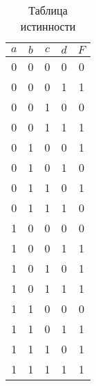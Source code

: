 \documentclass[a4paper]{article}
\begin{document}
    \begin{table}[h]
        \begin{center}
            \begin{tabular}{ | c | c | c | c | c | }
                \hline
                $ a $ & $ b $ & $ c $ & $ d $ & $ F $ \\
                \hline
                0     & 0     & 0     & 0     & 0     \\
                \hline
                0     & 0     & 0     & 1     & 1     \\
                \hline
                0     & 0     & 1     & 0     & 0     \\
                \hline
                0     & 0     & 1     & 1     & 1     \\
                \hline
                0     & 1     & 0     & 0     & 1     \\
                \hline
                0     & 1     & 0     & 1     & 0     \\
                \hline
                0     & 1     & 1     & 0     & 1     \\
                \hline
                0     & 1     & 1     & 1     & 0     \\
                \hline
                1     & 0     & 0     & 0     & 0     \\
                \hline
                1     & 0     & 0     & 1     & 1     \\
                \hline
                1     & 0     & 1     & 0     & 1     \\
                \hline
                1     & 0     & 1     & 1     & 1     \\
                \hline
                1     & 1     & 0     & 0     & 0     \\
                \hline
                1     & 1     & 0     & 1     & 1     \\
                \hline
                1     & 1     & 1     & 0     & 1     \\
                \hline
                1     & 1     & 1     & 1     & 1     \\
                \hline
            \end{tabular}
        \end{center}
        \caption{Таблица истинности}
        \label{tab:truth}
    \end{table}
\end{document}
